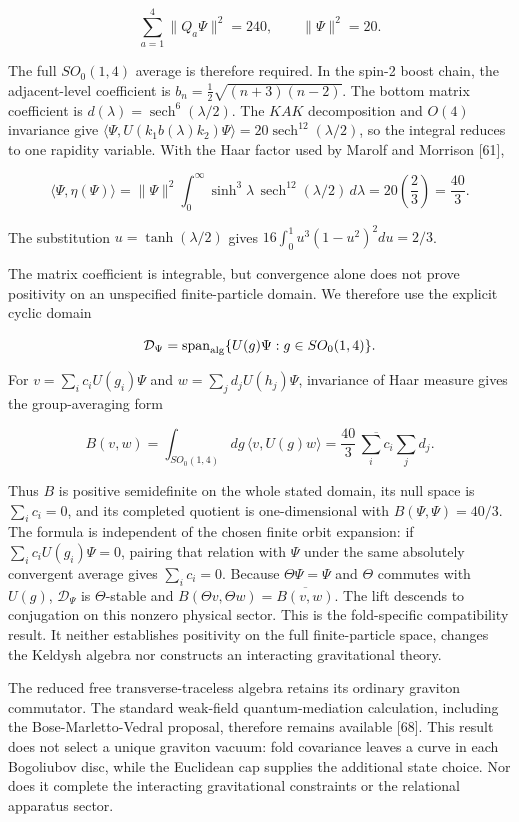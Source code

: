 \documentclass[
]{article}
\begin{document}
\[
\sum_{a=1}^{4}\|Q_a\Psi\|^2=240,
\qquad \|\Psi\|^2=20.
\]

The full \(SO_0(1,4)\) average is therefore required. In the spin-2
boost chain, the adjacent-level coefficient is
\(b_n=\tfrac12\sqrt{(n+3)(n-2)}\). The bottom matrix coefficient is
\(d(\lambda)=\operatorname{sech}^6(\lambda/2)\). The \(KAK\)
decomposition and \(O(4)\) invariance give
\(\langle\Psi,U(k_1b(\lambda)k_2)\Psi\rangle
=20\operatorname{sech}^{12}(\lambda/2)\), so the integral reduces to one
rapidity variable. With the Haar factor used by Marolf and Morrison
{[}61{]},

\[
\langle\Psi,\eta(\Psi)\rangle
=\|\Psi\|^2\int_0^\infty
\sinh^3\lambda\,\operatorname{sech}^{12}(\lambda/2)\,d\lambda
=20\left(\frac23\right)=\frac{40}{3}.
\]

The substitution \(u=\tanh(\lambda/2)\) gives
\(16\int_0^1u^3(1-u^2)^2du=2/3\).

The matrix coefficient is integrable, but convergence alone does not
prove positivity on an unspecified finite-particle domain. We therefore
use the explicit cyclic domain

\[
\mathcal D_\Psi=\operatorname{span}_{\rm alg}
\{U(g)\Psi:g\in SO_0(1,4)\}.
\]

For \(v=\sum_i c_iU(g_i)\Psi\) and \(w=\sum_j d_jU(h_j)\Psi\),
invariance of Haar measure gives the group-averaging form

\[
B(v,w)=\int_{SO_0(1,4)}dg\,\langle v,U(g)w\rangle
=\frac{40}{3}\,\overline{\sum_i c_i}\sum_j d_j.
\]

Thus \(B\) is positive semidefinite on the whole stated domain, its null
space is \(\sum_i c_i=0\), and its completed quotient is one-dimensional
with \(B(\Psi,\Psi)=40/3\). The formula is independent of the chosen
finite orbit expansion: if \(\sum_i c_iU(g_i)\Psi=0\), pairing that
relation with \(\Psi\) under the same absolutely convergent average
gives \(\sum_i c_i=0\). Because \(\Theta\Psi=\Psi\) and \(\Theta\)
commutes with \(U(g)\), \(\mathcal D_\Psi\) is \(\Theta\)-stable and
\(B(\Theta v,\Theta w)=\overline{B(v,w)}\). The lift descends to
conjugation on this nonzero physical sector. This is the fold-specific
compatibility result. It neither establishes positivity on the full
finite-particle space, changes the Keldysh algebra nor constructs an
interacting gravitational theory.

The reduced free transverse-traceless algebra retains its ordinary
graviton commutator. The standard weak-field quantum-mediation
calculation, including the Bose-Marletto-Vedral proposal, therefore
remains available {[}68{]}. This result does not select a unique
graviton vacuum: fold covariance leaves a curve in each Bogoliubov disc,
while the Euclidean cap supplies the additional state choice. Nor does
it complete the interacting gravitational constraints or the relational
apparatus sector.
\end{document}
